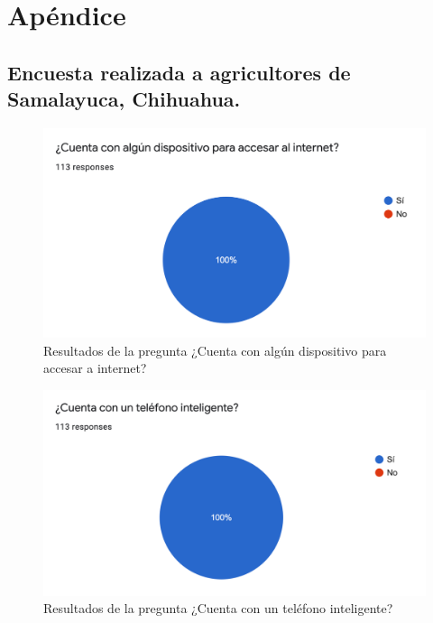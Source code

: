 \section{Apéndice}
\subsection{Encuesta realizada a agricultores de Samalayuca, Chihuahua.}

\begin{figure}[!h]
	\centering
	\includegraphics[width=.95\linewidth]{imagenes/encuesta/pregunta_1.png}
	\caption{Resultados de la pregunta ¿Cuenta con algún dispositivo para accesar a internet?}
	\label{fig:pregunta_1}
\end{figure}

\begin{figure}[!h]
	\centering
	\includegraphics[width=.95\linewidth]{imagenes/encuesta/pregunta_2.png}
	\caption{Resultados de la pregunta ¿Cuenta con un teléfono inteligente?}
	\label{fig:pregunta_2}
\end{figure}


